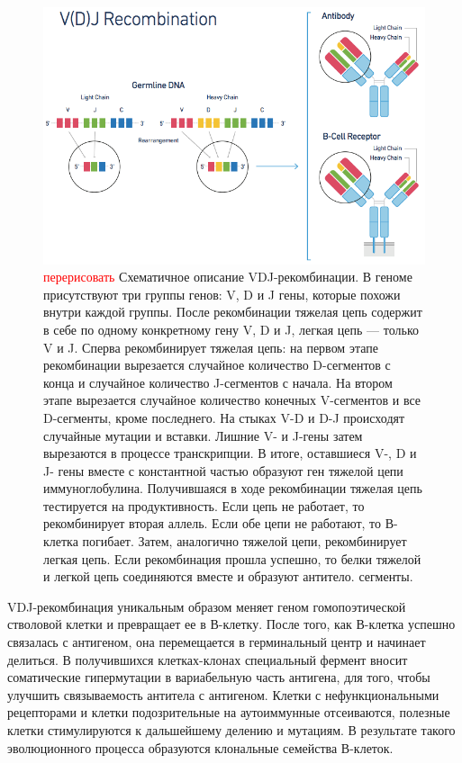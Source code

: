 \documentclass{spbau-diploma}
\newcommand{\todo}{\textcolor{red}}
\begin{document}
\begin{figure}[h!]
    \centering
    \includegraphics[width=.9\textwidth]{figures/10x_vdj_recombination.png}
    \caption{\todo{перерисовать} Схематичное описание VDJ-рекомбинации.
    В геноме присутствуют три группы генов: V, D и J гены, которые похожи внутри каждой группы.
    После рекомбинации тяжелая цепь содержит в себе по одному конкретному гену V, D и J, легкая цепь --- только V и J.
    Сперва рекомбинирует тяжелая цепь: на первом этапе рекомбинации вырезается случайное количество D-сегментов с конца и случайное количество J-сегментов с начала.
    На втором этапе вырезается случайное количество конечных V-сегментов и все D-сегменты, кроме последнего.
    На стыках V-D и D-J происходят случайные мутации и вставки.
    Лишние V- и J-гены затем вырезаются в процессе транскрипции.
    В итоге, оставшиеся V-, D и J- гены вместе с константной частью образуют ген тяжелой цепи иммуноглобулина.
    Получившаяся в ходе рекомбинации тяжелая цепь тестируется на продуктивность.
    Если цепь не работает, то рекомбинирует вторая аллель.
    Если обе цепи не работают, то В-клетка погибает.
    Затем, аналогично тяжелой цепи, рекомбинирует легкая цепь.
    Если рекомбинация прошла успешно, то белки тяжелой и легкой цепь соединяются вместе и образуют антитело.
    сегменты.}
    \label{10x_vdj_recombination}
\end{figure}

VDJ-рекомбинация уникальным образом меняет геном гомопоэтической стволовой клетки и превращает ее в В-клетку.
После того, как В-клетка успешно связалась с антигеном, она перемещается в герминальный центр и начинает делиться.
В получившихся клетках-клонах специальный фермент вносит соматические гипермутации в вариабельную часть антигена, для того, чтобы улучшить связываемость антитела с антигеном.
Клетки с нефункциональными рецепторами и клетки подозрительные на аутоиммунные отсеиваются, полезные клетки стимулируются к дальшейшему делению и мутациям.
В результате такого эволюционного процесса образуются клональные семейства В-клеток.
\end{document}
